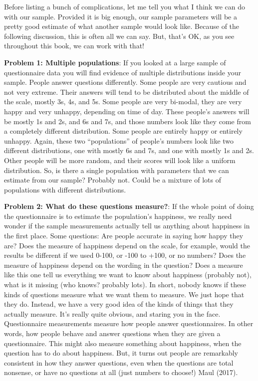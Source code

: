 \documentclass[
  letterpaper,
  DIV=11,
  numbers=noendperiod]{scrreprt}
\begin{document}
Before listing a bunch of complications, let me tell you what I think we
can do with our sample. Provided it is big enough, our sample parameters
will be a pretty good estimate of what another sample would look like.
Because of the following discussion, this is often all we can say. But,
that's OK, as you see throughout this book, we can work with that!

\textbf{Problem 1: Multiple populations}: If you looked at a large
sample of questionnaire data you will find evidence of multiple
distributions inside your sample. People answer questions differently.
Some people are very cautious and not very extreme. Their answers will
tend to be distributed about the middle of the scale, mostly 3s, 4s, and
5s. Some people are very bi-modal, they are very happy and very unhappy,
depending on time of day. These people's answers will be mostly 1s and
2s, and 6s and 7s, and those numbers look like they come from a
completely different distribution. Some people are entirely happy or
entirely unhappy. Again, these two ``populations'' of people's numbers
look like two different distributions, one with mostly 6s and 7s, and
one with mostly 1s and 2s. Other people will be more random, and their
scores will look like a uniform distribution. So, is there a single
population with parameters that we can estimate from our sample?
Probably not. Could be a mixture of lots of populations with different
distributions.

\textbf{Problem 2: What do these questions measure?}: If the whole point
of doing the questionnaire is to estimate the population's happiness, we
really need wonder if the sample measurements actually tell us anything
about happiness in the first place. Some questions: Are people accurate
in saying how happy they are? Does the measure of happiness depend on
the scale, for example, would the results be different if we used 0-100,
or -100 to +100, or no numbers? Does the measure of happiness depend on
the wording in the question? Does a measure like this one tell us
everything we want to know about happiness (probably not), what is it
missing (who knows? probably lots). In short, nobody knows if these
kinds of questions measure what we want them to measure. We just hope
that they do. Instead, we have a very good idea of the kinds of things
that they actually measure. It's really quite obvious, and staring you
in the face. Questionnaire measurements measure how people answer
questionnaires. In other words, how people behave and answer questions
when they are given a questionnaire. This might also measure something
about happiness, when the question has to do about happiness. But, it
turns out people are remarkably consistent in how they answer questions,
even when the questions are total nonsense, or have no questions at all
(just numbers to choose!) Maul (2017).
\end{document}
